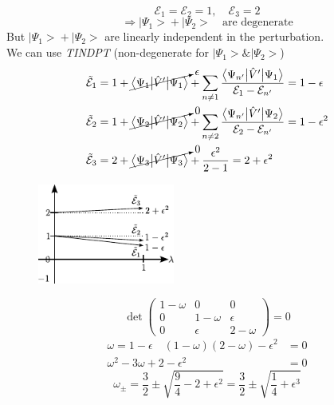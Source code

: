 \documentclass[12pt,fancychapters]{report}
\numberwithin{equation}{section}
\begin{document}
\[
  \mathcal{E}_1 = \mathcal{E}_2 = 1, \quad \mathcal{E}_3 = 2
\]
\[
  \Rightarrow \big|\Psi_1\big> + \big|\Psi_2\big> \quad \text{are degenerate}
\]
But $ \big|\Psi_1\big> + \big|\Psi_2\big> $ are linearly independent in the perturbation.\\
We can use \emph{TINDPT} (non-degenerate for $\big|\Psi_1\big> \& \big|\Psi_2\big>$)
\begin{align*}
  \tilde{\mathcal{E}}_1 &= 1 + 
  \cancelto{\epsilon}{\big<\Psi_1\big|\hat{V}'\big|\Psi_1 \big>} + \sum_{n\neq 1}
  \frac{\big<\Psi_{n'}\big|\hat{V}'\big|\Psi_1 \big>}{\mathcal{E}_1 - 
  \mathcal{E}_{n'}} = 1-\epsilon\\
  \tilde{\mathcal{E}}_2 &= 1 + \cancelto{0}{\big<\Psi_2\big|\hat{V}'\big|\Psi_2 \big>} + \sum_{n\neq 2}
  \frac{\big<\Psi_{n'}\big|\hat{V}'\big|\Psi_2 \big>}{\mathcal{E}_2 - 
  \mathcal{E}_{n'}} = 1-\epsilon^2\\
  \tilde{\mathcal{E}}_3 &= 2 +\cancelto{0}{\big<\Psi_3\big|\hat{V}'\big|\Psi_3 \big>} +
  \frac{\epsilon^2}{2-1} = 2 + \epsilon^2
\end{align*}
\begin{figure}[H]
  \centering
	\includegraphics[width=0.4\textwidth]{../Figures/EN4.pdf}
\end{figure}
\[
  \det 
  \begin{pmatrix}
  1-\omega & 0 & 0\\
  0 & 1-\omega & \epsilon\\
  0 & \epsilon & 2-\omega
\end{pmatrix}
 = 0 
\]
\begin{align*}
  \omega = 1 -\epsilon \quad (1 - \omega)(2-\omega) - \epsilon^2 &= 0\\
  \omega^2 - 3\omega + 2 - \epsilon^2 &= 0
\end{align*}
\[
  \boxed{\omega_\pm = \frac{3}{2} \pm \sqrt{\frac{9}{4}-2+\epsilon^2} = \frac{3}{2} \pm
  \sqrt{\frac{1}{4} + \epsilon^3}}
\]
\newpage
\end{document}
